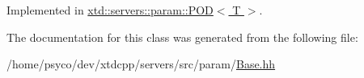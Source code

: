 Implemented in \hyperlink{classxtd_1_1servers_1_1param_1_1POD_aded664a97a02450a9270dd04af042d0c}{xtd\+::servers\+::param\+::\+P\+O\+D$<$ T $>$}.



The documentation for this class was generated from the following file\+:\begin{DoxyCompactItemize}
\item 
/home/psyco/dev/xtdcpp/servers/src/param/\hyperlink{Base_8hh}{Base.\+hh}\end{DoxyCompactItemize}
